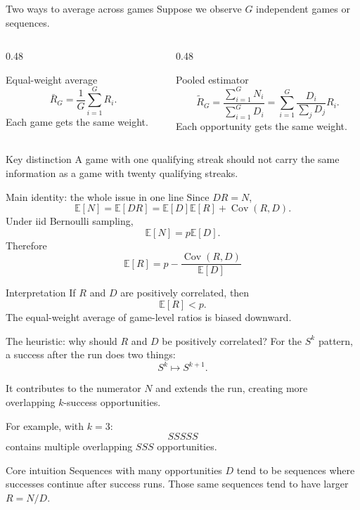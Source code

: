 \documentclass[aspectratio=169,professionalfonts]{beamer}
\newcommand{\E}{\mathbb{E}}
\newcommand{\Cov}{\operatorname{Cov}}
\begin{document}
\begin{frame}{Two ways to average across games}
Suppose we observe $G$ independent games or sequences.

\vspace{0.2cm}
\begin{columns}[T]
\begin{column}{0.48\textwidth}
\begin{block}{Equal-weight average}
\[
\bar R_G=\frac{1}{G}\sum_{i=1}^G R_i.
\]
Each game gets the same weight.
\end{block}
\end{column}
\begin{column}{0.48\textwidth}
\begin{block}{Pooled estimator}
\[
\widetilde R_G=
\frac{\sum_{i=1}^G N_i}{\sum_{i=1}^G D_i}
=\sum_{i=1}^G
\frac{D_i}{\sum_j D_j}R_i.
\]
Each opportunity gets the same weight.
\end{block}
\end{column}
\end{columns}

\vspace{0.3cm}
\begin{alertblock}{Key distinction}
A game with one qualifying streak should not carry the same information as a game with twenty qualifying streaks.
\end{alertblock}
\end{frame}

\begin{frame}{Main identity: the whole issue in one line}
Since $DR=N$,
\[
  \E[N]=\E[DR]=\E[D]\E[R]+\Cov(R,D).
\]
Under iid Bernoulli sampling,
\[
  \E[N]=p\E[D].
\]
Therefore
\[
\boxed{
  \E[R]
  =
  p-\frac{\Cov(R,D)}{\E[D]}
}
\]

\vspace{0.3cm}
\begin{block}{Interpretation}
If $R$ and $D$ are positively correlated, then
\[
  \E[R]<p.
\]
The equal-weight average of game-level ratios is biased downward.
\end{block}
\end{frame}

\begin{frame}{The heuristic: why should $R$ and $D$ be positively correlated?}
For the $S^k$ pattern, a success after the run does two things:
\[
  S^k \mapsto S^{k+1}.
\]

\vspace{0.2cm}
It contributes to the numerator $N$ and extends the run, creating more overlapping $k$-success opportunities.

\vspace{0.3cm}
For example, with $k=3$:
\[
  SSSS S
\]
contains multiple overlapping $SSS$ opportunities.

\vspace{0.3cm}
\begin{alertblock}{Core intuition}
Sequences with many opportunities $D$ tend to be sequences where successes continue after success runs. Those same sequences tend to have larger $R=N/D$.
\end{alertblock}
\end{frame}
\end{document}
